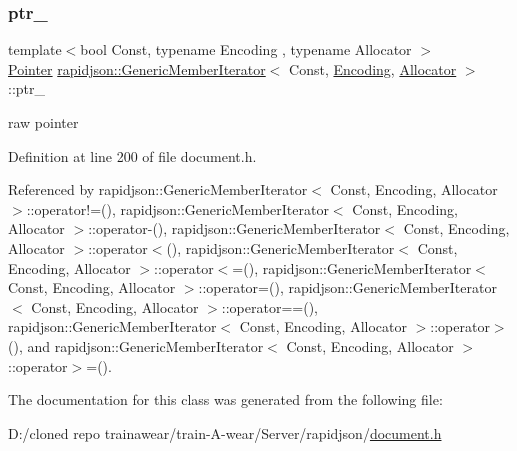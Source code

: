 \subsubsection{\texorpdfstring{ptr\_}{ptr\_}}
{\footnotesize\ttfamily template$<$bool Const, typename Encoding , typename Allocator $>$ \\
\mbox{\hyperlink{classrapidjson_1_1_generic_member_iterator_aa9d53504374c7c6bdf46775482c5b107}{Pointer}} \mbox{\hyperlink{classrapidjson_1_1_generic_member_iterator}{rapidjson\+::\+Generic\+Member\+Iterator}}$<$ Const, \mbox{\hyperlink{classrapidjson_1_1_encoding}{Encoding}}, \mbox{\hyperlink{classrapidjson_1_1_allocator}{Allocator}} $>$\+::ptr\+\_\+\hspace{0.3cm}{\ttfamily [private]}}



raw pointer 



Definition at line 200 of file document.\+h.



Referenced by rapidjson\+::\+Generic\+Member\+Iterator$<$ Const, Encoding, Allocator $>$\+::operator!=(), rapidjson\+::\+Generic\+Member\+Iterator$<$ Const, Encoding, Allocator $>$\+::operator-\/(), rapidjson\+::\+Generic\+Member\+Iterator$<$ Const, Encoding, Allocator $>$\+::operator$<$(), rapidjson\+::\+Generic\+Member\+Iterator$<$ Const, Encoding, Allocator $>$\+::operator$<$=(), rapidjson\+::\+Generic\+Member\+Iterator$<$ Const, Encoding, Allocator $>$\+::operator=(), rapidjson\+::\+Generic\+Member\+Iterator$<$ Const, Encoding, Allocator $>$\+::operator==(), rapidjson\+::\+Generic\+Member\+Iterator$<$ Const, Encoding, Allocator $>$\+::operator$>$(), and rapidjson\+::\+Generic\+Member\+Iterator$<$ Const, Encoding, Allocator $>$\+::operator$>$=().



The documentation for this class was generated from the following file\+:\begin{DoxyCompactItemize}
\item 
D\+:/cloned repo trainawear/train-\/\+A-\/wear/\+Server/rapidjson/\mbox{\hyperlink{document_8h}{document.\+h}}\end{DoxyCompactItemize}
